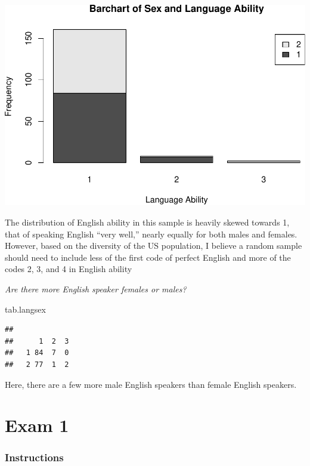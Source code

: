\documentclass[
]{article}
\newenvironment{Shaded}{\begin{snugshade}}{\end{snugshade}}
\newcommand{\NormalTok}[1]{#1}
\begin{document}
\includegraphics{Journal_files/figure-latex/unnamed-chunk-19-1.pdf}

The distribution of English ability in this sample is heavily skewed
towards 1, that of speaking English ``very well,'' nearly equally for
both males and females. However, based on the diversity of the US
population, I believe a random sample should need to include less of the
first code of perfect English and more of the codes 2, 3, and 4 in
English ability

\emph{Are there more English speaker females or males?}

\begin{Shaded}
\begin{Highlighting}[]
\NormalTok{tab.langsex}
\end{Highlighting}
\end{Shaded}

\begin{verbatim}
##    
##      1  2  3
##   1 84  7  0
##   2 77  1  2
\end{verbatim}

Here, there are a few more male English speakers than female English
speakers.

\hypertarget{exam-1}{%
\section{Exam 1}\label{exam-1}}

\hypertarget{instructions}{%
\subsubsection{Instructions}\label{instructions}}
\end{document}
